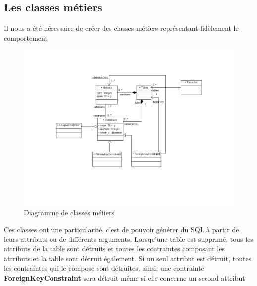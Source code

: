 \subsection{Les classes métiers}
Il nous a été nécessaire de créer des classes métiers représentant fidèlement le comportement 

\begin{figure}[!h]
\centering
\includegraphics[width=13cm]{images/metier.png}
\caption{Diagramme de classes métiers}
\label{classes_metiers}
\end{figure}


Ces classes ont une particularité, c'est de pouvoir générer du SQL à partir de leurs attributs ou de différents arguments.
Lorsqu'une table est supprimé, tous les attributs de la table sont détruits et toutes les contraintes composant les attributs et la table sont détruit également.
Si un seul attribut est détruit, toutes les contraintes qui le compose sont détruites, ainsi, une contrainte \textbf{ForeignKeyConstraint} sera détruit même si elle concerne un second attribut
